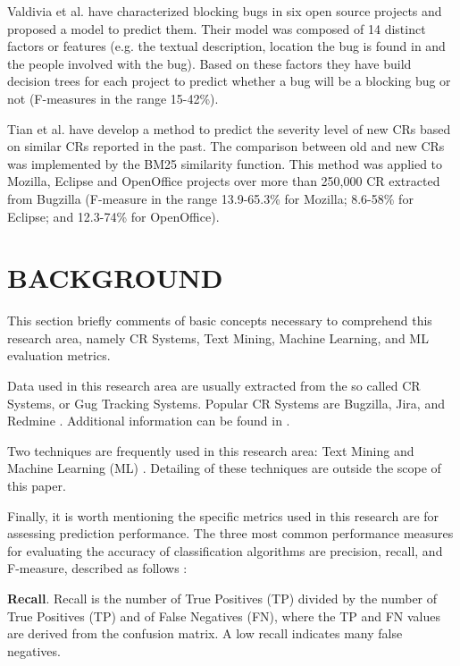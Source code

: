 \documentclass[10pt, conference]{IEEEtran}
\begin{document}
Valdivia et al.\cite{ValdiviaGarcia2014} have characterized blocking bugs in six open source projects and proposed a model to predict them. Their model was composed of 14 distinct factors or features (e.g. the textual description, location the bug is found in and the people involved with the bug). Based on these factors they have build decision trees for each project to predict whether a bug will be a blocking bug or not (F-measures in the range 15-42\%).

Tian et al.\cite{Tian2012} have develop a method to predict the severity level of new CRs based on similar CRs reported in the past. The comparison between old and new CRs was implemented by the BM25 similarity function. This method was applied to Mozilla, Eclipse and OpenOffice projects over more than 250,000 CR extracted from Bugzilla (F-measure in the range 13.9-65.3\% for Mozilla; 8.6-58\% for Eclipse; and 12.3-74\% for OpenOffice). 


\section{BACKGROUND} \label{sec:background} 
 

This section briefly comments of basic concepts necessary to comprehend this research area, namely CR Systems, Text Mining, Machine Learning, and ML evaluation metrics.

Data used in this research area are usually extracted from the so called CR Systems, or Gug Tracking Systems. Popular CR Systems are Bugzilla, Jira, and Redmine \cite{Tian2012}. Additional information can be found in \cite{Pressman2009}.

Two techniques are frequently used in this research area: Text Mining  \cite{Feldman2007} \cite{Williams2011} and Machine Learning (ML) \cite{Williams2011} \cite{Surya2016} \cite{Russell2010} \cite{Breiman2001}. Detailing of these techniques are outside the scope of this paper.

Finally, it is worth mentioning the specific metrics used in this research are for assessing prediction performance. The three most common performance measures for evaluating the accuracy of classification algorithms are precision, recall, and F-measure, described as follows \cite{Facelli2015} \cite{Zhao2013}:

\textbf{Recall}. Recall is the number of True Positives (TP) divided by the number of True Positives (TP) and of False Negatives (FN), where the TP and FN values are derived from the confusion matrix. A low recall indicates many false negatives.
\end{document}
